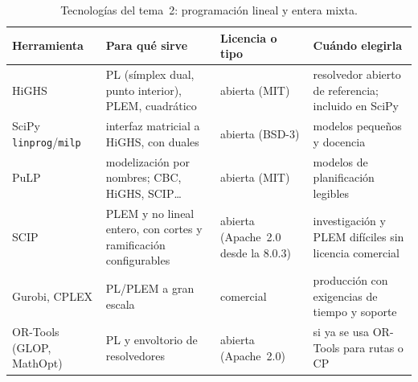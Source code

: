 \begin{table}[h]
\centering\small
\caption{Tecnologías del tema~2: programación lineal y entera mixta.}\label{tab:tec2}
\begin{tabularx}{\textwidth}{@{}l>{\raggedright\arraybackslash}X>{\raggedright\arraybackslash}p{2.3cm}>{\raggedright\arraybackslash}X@{}}
\toprule
Herramienta & Para qué sirve & Licencia o tipo & Cuándo elegirla \\
\midrule
HiGHS~\cite{highs} & PL (símplex dual, punto interior), PLEM, cuadrático & abierta (MIT) & resolvedor abierto de referencia; incluido en SciPy \\
SciPy \texttt{linprog}/\texttt{milp} & interfaz matricial a HiGHS, con duales & abierta (BSD-3) & modelos pequeños y docencia \\
PuLP~\cite{pulp} & modelización por nombres; CBC, HiGHS, SCIP\dots & abierta (MIT) & modelos de planificación legibles \\
SCIP & PLEM y no lineal entero, con cortes y ramificación configurables & abierta (Apache~2.0 desde la 8.0.3) & investigación y PLEM difíciles sin licencia comercial \\
Gurobi, CPLEX & PL/PLEM a gran escala & comercial & producción con exigencias de tiempo y soporte \\
OR-Tools (GLOP, MathOpt) & PL y envoltorio de resolvedores & abierta (Apache~2.0) & si ya se usa OR-Tools para rutas o CP \\
\bottomrule
\end{tabularx}
\end{table}

\addtocounter{definicion}{1}%

